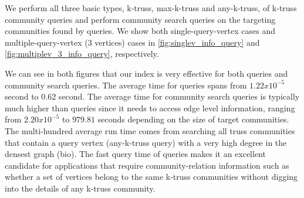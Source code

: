 

We perform all three basic types, \ie k-truss, max-k-truss and any-k-truss, of \toplevelprob{} k-truss community queries and perform community search queries on the targeting communities found by \toplevelprob{} queries. We show both single-query-vertex cases and multiple-query-vertex ($3$ vertices) cases in \autoref{fig:singlev_info_query} and \autoref{fig:multiplev_3_info_query}, respectively. 

We can see in both figures that our index is very effective for both \toplevelprob{} queries and community search queries. The average time for \toplevelprob{} queries spans from $1.22 x 10^{-5}$ second to $0.62$ second. The average time for community search queries is typically much higher than \toplevelprob{} queries since it needs to access edge level information, ranging from $2.20 x 10^{-5}$ to $979.81$ seconds depending on the size of target communities. The multi-hundred average run time comes from searching all truss communities that contain a query vertex (any-k-truss query) with a very high degree in the densest graph (bio). The fast query time of \toplevelprob{} queries makes it an excellent candidate for applications that require community-relation information such as whether a set of vertices belong to the same k-truss communities without digging into the details of any k-truss community. 

